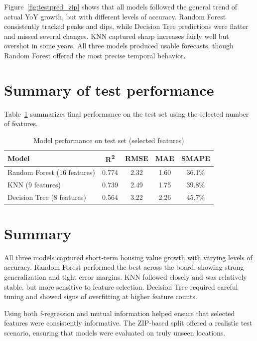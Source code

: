 Figure~\ref{fig:testpred_zip} shows that all models followed the general trend of actual YoY growth, but with different levels of accuracy. Random Forest consistently tracked peaks and dips, while Decision Tree predictions were flatter and missed several changes. KNN captured sharp increases fairly well but overshot in some years. All three models produced usable forecasts, though Random Forest offered the most precise temporal behavior.

\section{Summary of test performance}

Table~\ref{tab:model_results} summarizes final performance on the test set using the selected number of features.

\begin{table}[!ht]
    \centering
    \caption{Model performance on test set (selected features)}
    \label{tab:model_results}
    \begin{tabular}{lcccc}
        \toprule
        \textbf{Model} & \textbf{R\textsuperscript{2}} & \textbf{RMSE} & \textbf{MAE} & \textbf{SMAPE} \\
        \midrule
        Random Forest (16 features) & 0.774 & 2.32 & 1.60 & 36.1\% \\
        KNN (9 features)            & 0.739 & 2.49 & 1.75 & 39.8\% \\
        Decision Tree (8 features) & 0.564 & 3.22 & 2.26 & 45.7\% \\
        \bottomrule
    \end{tabular}
\end{table}
\FloatBarrier

\section{Summary}

All three models captured short-term housing value growth with varying levels of accuracy. Random Forest performed the best across the board, showing strong generalization and tight error margins. KNN followed closely and was relatively stable, but more sensitive to feature selection. Decision Tree required careful tuning and showed signs of overfitting at higher feature counts.

Using both f-regression and mutual information helped ensure that selected features were consistently informative. The ZIP-based split offered a realistic test scenario, ensuring that models were evaluated on truly unseen locations.

